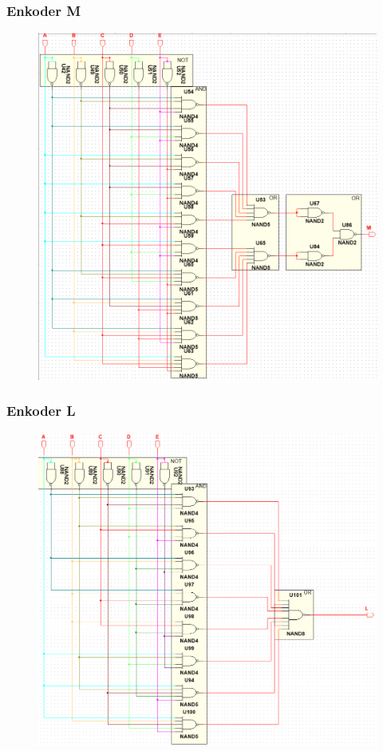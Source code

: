 \documentclass[a4paper]{article}
\begin{document}
\subsubsection{Enkoder M}
 \begin{figure}[H]
  \centering
  \includegraphics[width=\linewidth]{enkoder_bcd_M.png}
\end{figure}


\subsubsection{Enkoder L}
\begin{figure}[H]
 \centering
 \includegraphics[width=\linewidth]{enkoder_bcd_L.png}
\end{figure}
\end{document}
